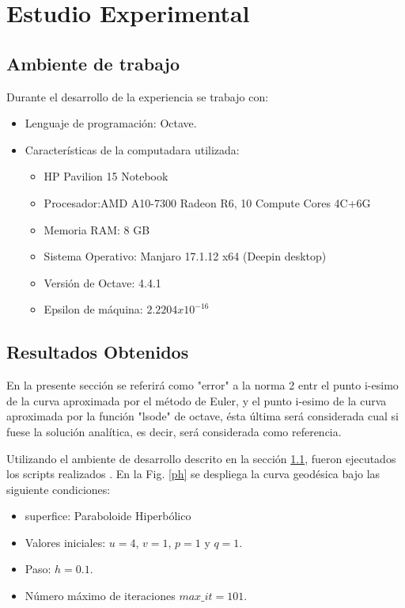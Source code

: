\documentclass{endm}
\begin{document}
\section{Estudio Experimental}\label{Resultados}
\subsection{Ambiente de trabajo}\label{ambiente}
Durante el desarrollo de la experiencia se trabajo con:
\begin{itemize}
    \item Lenguaje de programaci\'on: Octave.
    \item Caracter\'isticas de la computadara utilizada:
    \begin{itemize}
        \item HP Pavilion 15 Notebook
        \item Procesador:AMD A10-7300 Radeon R6, 10 Compute Cores 4C+6G
        \item Memoria RAM: 8 GB
        \item Sistema Operativo: Manjaro 17.1.12 x64 (Deepin desktop)
        \item Versión de Octave: 4.4.1
        \item Epsilon de m\'aquina: $2.2204x10^{-16}$
    \end{itemize}
\end{itemize}


\subsection{Resultados Obtenidos}
En la presente secci\'on se referir\'a como "error" a la norma 2 entr el punto i-esimo de la curva aproximada por el m\'etodo de Euler, y el punto i-esimo de la curva aproximada por la funci\'on "lsode" de octave, \'esta \'ultima ser\'a considerada cual si fuese la soluci\'on anal\'itica, es decir, ser\'a considerada como referencia.

Utilizando el ambiente de desarrollo descrito en la secci\'on \ref{ambiente}, fueron ejecutados los scripts realizados \cite{scripts}.
En la Fig. \ref{ph} se despliega la curva geod\'esica bajo las siguiente condiciones:
\begin{itemize}
    \item superfice: Paraboloide Hiperb\'olico
    \item Valores iniciales: $u=4$, $v=1$, $p=1$ y $q=1$.
    \item Paso: $h=0.1$.
    \item N\'umero m\'aximo de iteraciones $max\_it=101$.
\end{itemize}
\end{document}
